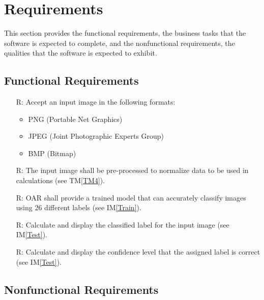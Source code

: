\documentclass[12pt]{article}
\newcommand{\tref}[1]{TM\ref{#1}}
\newcommand{\iref}[1]{IM\ref{#1}}
\newcounter{reqnum} %
\begin{document}
\section{Requirements}

This section provides the functional requirements, the business tasks that the
software is expected to complete, and the nonfunctional requirements, the
qualities that the software is expected to exhibit.

\subsection{Functional Requirements}

\noindent \begin{itemize}

\item[R\refstepcounter{reqnum}\thereqnum \label{R1}:] Accept an input image in the following formats: \begin{itemize}
  \item PNG (Portable Net Graphics)
  \item JPEG (Joint Photographic Experts Group)
  \item BMP (Bitmap)
\end{itemize}

\item[R\refstepcounter{reqnum}\thereqnum \label{R2}:] The input image shall be pre-processed to normalize data to be used in calculations (see \tref{TM4}).

\item[R\refstepcounter{reqnum}\thereqnum \label{R3}:] OAR shall provide a trained model that can accurately classify images using
26 different labels (see \iref{Train}).

\item[R\refstepcounter{reqnum}\thereqnum \label{R4}:] Calculate and display the classified label for the input image (see \iref{Test}).

\item[R\refstepcounter{reqnum}\thereqnum \label{R5}:] Calculate and display the confidence level that the assigned
label is correct (see \iref{Test}).

\end{itemize}

\subsection{Nonfunctional Requirements}
\end{document}
